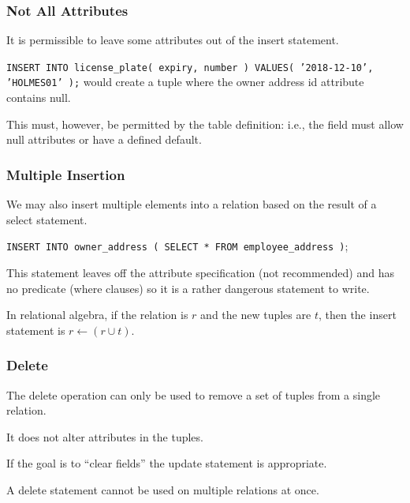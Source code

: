 \begin{frame}
\frametitle{Not All Attributes}

It is permissible to leave some attributes out of the insert statement. 

\texttt{INSERT INTO license\_plate( expiry, number ) VALUES( '2018-12-10', 'HOLMES01' );} would create a tuple where the owner address id attribute contains null. 

This must, however, be permitted by the table definition: i.e., the field must allow null attributes or have a defined default.


\end{frame}



\begin{frame}
\frametitle{Multiple Insertion}


We may also insert multiple elements into a relation based on the result of a select statement. 

\texttt{INSERT INTO owner\_address ( SELECT * FROM employee\_address )};

This statement leaves off the attribute specification (not recommended) and has no predicate (where clauses) so it is a rather dangerous statement to write.

In relational algebra, if the relation is $r$ and the new tuples are $t$, then the insert statement is $r \leftarrow (r \cup t)$.


\end{frame}


\begin{frame}
\frametitle{Delete}

The delete operation can only be used to remove a set of tuples from a single relation.

It does not alter attributes in the tuples. 

If the goal is to ``clear fields'' the update statement is appropriate. 

A delete statement cannot be used on multiple relations at once.


\end{frame}



